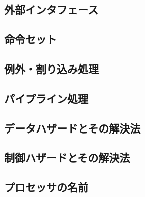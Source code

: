 \documentclass[../main.tex]{subfiles}
\begin{document}
  \subsection{外部インタフェース}
  

  \subsection{命令セット}
  

  \subsection{例外・割り込み処理}
  

  \subsection{パイプライン処理}
  

  \subsection{データハザードとその解決法}
  

  \subsection{制御ハザードとその解決法}
  

  \subsection{プロセッサの名前}
\end{document}

